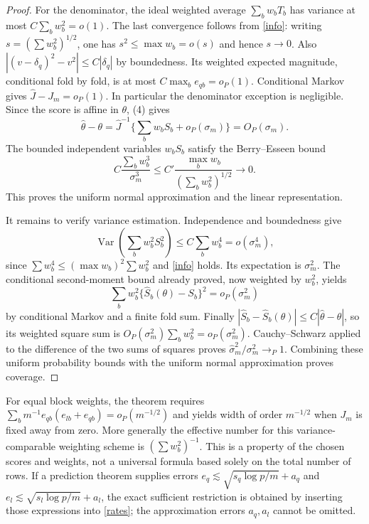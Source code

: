 \documentclass[11pt]{article}
\theoremstyle{remark}
\newcommand{\Var}{\operatorname{Var}}
\begin{document}
\begin{proof}
For the denominator, the ideal weighted average $\sum_b w_bT_b$ has variance at most $C\sum_b w_b^2=o(1)$. The last convergence follows from \eqref{info}: writing $s=(\sum w_b^2)^{1/2}$, one has $s^2\leq\max w_b=o(s)$ and hence $s\to0$. Also
$|(v-\delta_q)^2-v^2|\leq C|\delta_q|$ by boundedness. Its weighted expected magnitude, conditional fold by fold, is at most $C\max_b e_{qb}=o_P(1)$. Conditional Markov gives $\widehat J-J_m=o_P(1)$. In particular the denominator exception is negligible. Since the score is affine in $\theta$, (4) gives
\[
 \widehat\theta-\theta=\widehat J^{-1}
       \{\sum_b w_bS_b+o_P(\sigma_m)\}=O_P(\sigma_m).
\]
The bounded independent variables $w_bS_b$ satisfy the Berry--Esseen bound
\[
 C\frac{\sum_b w_b^3}{\sigma_m^3}
 \leq C'\frac{\max_b w_b}{(\sum_b w_b^2)^{1/2}}\longrightarrow0.
\]
This proves the uniform normal approximation and the linear representation.

It remains to verify variance estimation. Independence and boundedness give
\[
 \Var\left(\sum_b w_b^2S_b^2\right)\leq C\sum_b w_b^4
       =o(\sigma_m^4),
\]
since $\sum w_b^4\leq(\max w_b)^2\sum w_b^2$ and \eqref{info} holds. Its expectation is $\sigma_m^2$. The conditional second-moment bound already proved, now weighted by $w_b^2$, yields
\[
 \sum_b w_b^2\{\widehat S_b(\theta)-S_b\}^2=o_P(\sigma_m^2)
\]
by conditional Markov and a finite fold sum. Finally
$|\widehat S_b-\widehat S_b(\theta)|\leq C|\widehat\theta-\theta|$, so its weighted square sum is
$O_P(\sigma_m^2)\sum_b w_b^2=o_P(\sigma_m^2)$.
Cauchy--Schwarz applied to the difference of the two sums of squares proves $\widehat\sigma_m^2/\sigma_m^2\to_P1$. Combining these uniform probability bounds with the uniform normal approximation proves coverage.
\end{proof}

For equal block weights, the theorem requires
$\sum_bm^{-1}e_{qb}(e_{lb}+e_{qb})=o_P(m^{-1/2})$ and yields width of order $m^{-1/2}$ when $J_m$ is fixed away from zero. More generally the effective number for this variance-comparable weighting scheme is $(\sum w_b^2)^{-1}$. This is a property of the chosen scores and weights, not a universal formula based solely on the total number of rows. If a prediction theorem supplies errors
$e_q\lesssim\sqrt{s_q\log p/m}+a_q$ and
$e_l\lesssim\sqrt{s_l\log p/m}+a_l$, the exact sufficient restriction is obtained by inserting those expressions into \eqref{rates}; the approximation errors $a_q,a_l$ cannot be omitted.
\end{document}
